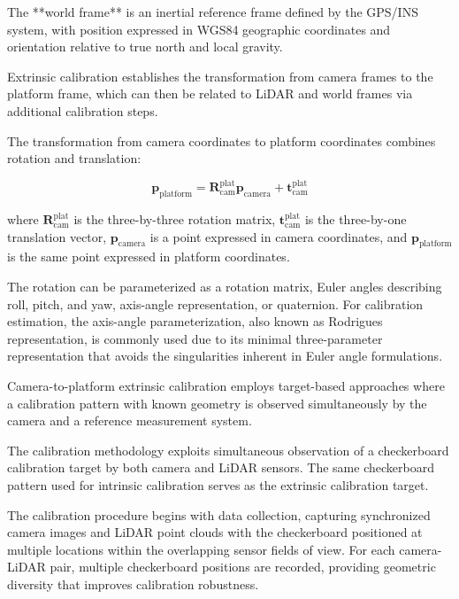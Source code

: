 \documentclass{erauthesis}
\begin{document}
The **world frame** is an inertial reference frame defined by the GPS/INS system, with position expressed in WGS84 geographic coordinates and orientation relative to true north and local gravity.

Extrinsic calibration establishes the transformation from camera frames to the platform frame, which can then be related to LiDAR and world frames via additional calibration steps.


The transformation from camera coordinates to platform coordinates combines rotation and translation:

\begin{equation}
    \mathbf{p}_{\text{platform}} = \mathbf{R}_{\text{cam}}^{\text{plat}} \mathbf{p}_{\text{camera}} + \mathbf{t}_{\text{cam}}^{\text{plat}}    
\end{equation}


where $\mathbf{R}_{\text{cam}}^{\text{plat}}$ is the three-by-three rotation matrix, $\mathbf{t}_{\text{cam}}^{\text{plat}}$ is the three-by-one translation vector, $\mathbf{p}_{\text{camera}}$ is a point expressed in camera coordinates, and $\mathbf{p}_{\text{platform}}$ is the same point expressed in platform coordinates.

The rotation can be parameterized as a rotation matrix, Euler angles describing roll, pitch, and yaw, axis-angle representation, or quaternion.
For calibration estimation, the axis-angle parameterization, also known as Rodrigues representation, is commonly used due to its minimal three-parameter representation that avoids the singularities inherent in Euler angle formulations.


Camera-to-platform extrinsic calibration employs target-based approaches where a calibration pattern with known geometry is observed simultaneously by the camera and a reference measurement system.


The calibration methodology exploits simultaneous observation of a checkerboard calibration target by both camera and LiDAR sensors.
The same checkerboard pattern used for intrinsic calibration serves as the extrinsic calibration target.

The calibration procedure begins with data collection, capturing synchronized camera images and LiDAR point clouds with the checkerboard positioned at multiple locations within the overlapping sensor fields of view.
For each camera-LiDAR pair, multiple checkerboard positions are recorded, providing geometric diversity that improves calibration robustness.
\end{document}
